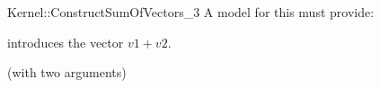 \begin{ccRefFunctionObjectConcept}{Kernel::ConstructSumOfVectors_3}
A model for this must provide:


            {introduces the vector $v1 + v2$.}


\ccRefines
{} (with two arguments)

\ccSeeAlso
{}\\

\end{ccRefFunctionObjectConcept}
